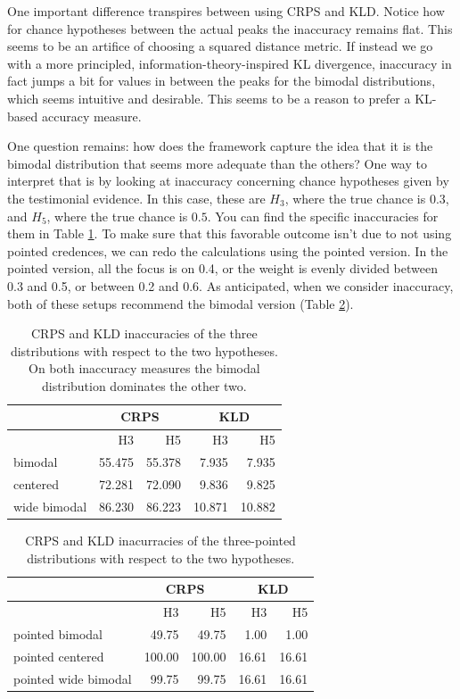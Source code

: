\documentclass[
  letterpaper,
  DIV=11,
  numbers=noendperiod]{scrartcl}
\begin{document}
One important difference transpires between using CRPS and KLD. Notice
how for chance hypotheses between the actual peaks the inaccuracy
remains flat. This seems to be an artifice of choosing a squared
distance metric. If instead we go with a more principled,
information-theory-inspired KL divergence, inaccuracy in fact jumps a
bit for values in between the peaks for the bimodal distributions, which
seems intuitive and desirable. This seems to be a reason to prefer a
KL-based accuracy measure.

One question remains: how does the framework capture the idea that it is
the bimodal distribution that seems more adequate than the others? One
way to interpret that is by looking at inaccuracy concerning chance
hypotheses given by the testimonial evidence. In this case, these are
\(H_3\), where the true chance is \(0.3\), and \(H_5\), where the true
chance is \(0.5\). You can find the specific inaccuracies for them in
Table \ref{tbl:schoen}. To make sure that this favorable outcome isn't
due to not using pointed credences, we can redo the calculations using
the pointed version. In the pointed version, all the focus is on 0.4, or
the weight is evenly divided between 0.3 and 0.5, or between 0.2 and
0.6. As anticipated, when we consider inaccuracy, both of these setups
recommend the bimodal version (Table \ref{tbl:schoen2}).

\begin{table}[H]
\centering
\begin{tabular}{lrrrr}
 & \multicolumn{2}{c}{CRPS} & \multicolumn{2}{c}{KLD} \\
\toprule
&H3 & H5 & H3 & H5\\
\midrule
bimodal &55.475 & 55.378 & 7.935 & 7.935\\
centered &72.281 & 72.090 & 9.836 & 9.825\\
wide bimodal & 86.230 & 86.223 & 10.871 & 10.882\\
\bottomrule
\end{tabular}
\caption{CRPS and KLD inaccuracies of the three distributions with respect to the two hypotheses. On both inaccuracy measures the bimodal distribution dominates the other two.}
\label{tbl:schoen}
\end{table}

\begin{table}[H]
\centering
\begin{tabular}{lrrrr}
 & \multicolumn{2}{c}{CRPS} & \multicolumn{2}{c}{KLD} \\
\toprule
 &H3 & H5 & H3 & H5\\ \midrule
pointed bimodal &49.75 & 49.75 & 1.00 & 1.00\\
pointed centered &100.00 & 100.00 & 16.61 & 16.61\\
pointed wide bimodal & 99.75 & 99.75 & 16.61 & 16.61\\
\bottomrule
\end{tabular}
\caption{CRPS and KLD inacurracies of the three-pointed distributions with respect to the two hypotheses.}
\label{tbl:schoen2}
\end{table}
\end{document}
